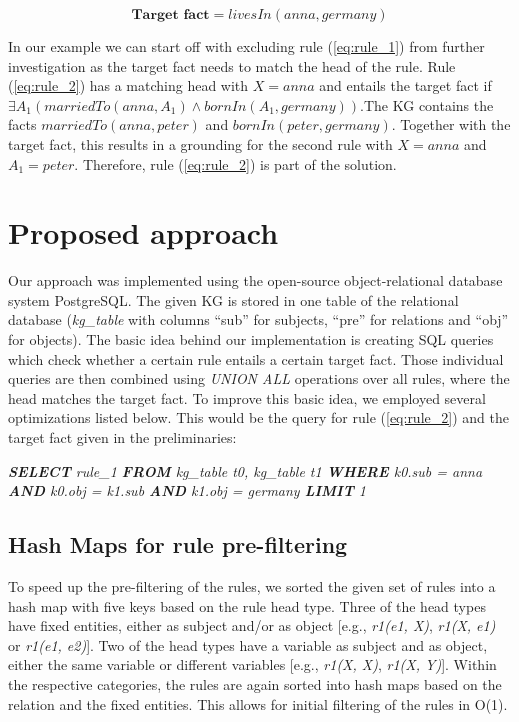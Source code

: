 \documentclass[english]{lni}
\begin{document}
\[\textbf{Target fact} = livesIn(anna, germany)\] 

In our example we can start off with excluding rule (\ref{eq:rule_1}) from further investigation as the target fact needs to match the head of the rule. Rule (\ref{eq:rule_2}) has a matching head with \(X = anna\) and entails the target fact if \(\exists A_1 (marriedTo(anna, A_1) \wedge bornIn(A_1, germany))\).The KG contains the facts \(marriedTo(anna, peter)\) and \(bornIn(peter, germany)\). Together with the target fact, this results in a grounding for the second rule with \(X = anna\) and \(A_1 = peter\). Therefore, rule (\ref{eq:rule_2}) is part of the solution.

\section{Proposed approach}

Our approach was implemented using the open-source object-relational database system PostgreSQL. The given KG is stored in one table of the relational database (\textit{kg\_table} with columns “sub” for subjects, “pre” for relations and “obj” for objects). The basic idea behind our implementation is creating SQL queries which check whether a certain rule entails a certain target fact. Those individual queries are then combined using \textit{UNION ALL} operations over all rules, where the head matches the target fact. To improve this basic idea, we employed several optimizations listed below. This would be the query for rule (\ref{eq:rule_2}) and the target fact given in the preliminaries:

\textit{\textbf{SELECT} rule\_1 \textbf{FROM} kg\_table t0,  kg\_table t1 \textbf{WHERE} k0.sub = anna \textbf{AND} k0.obj = k1.sub \textbf{AND} k1.obj = germany \textbf{LIMIT} 1}


\subsection{Hash Maps for rule pre-filtering} 
To speed up the pre-filtering of the rules, we sorted the given set of rules into a hash map with five keys based on the rule head type. Three of the head types have fixed entities, either as subject and/or as object [e.g., \textit{r1(e1, X)}, \textit{r1(X, e1)} or \textit{r1(e1, e2)}]. Two of the head types have a variable as subject and as object, either the same variable or different variables [e.g., \textit{r1(X, X)}, \textit{r1(X, Y)}]. Within the respective categories, the rules are again sorted into hash maps based on the relation and the fixed entities. This allows for initial filtering of the rules in O(1).
\end{document}
